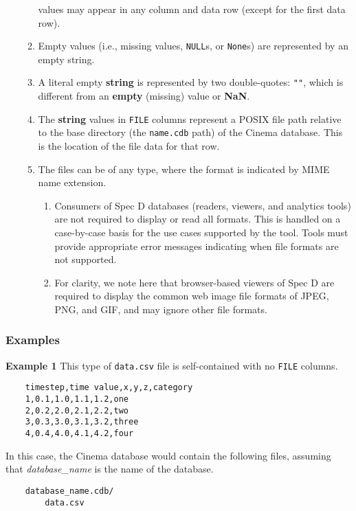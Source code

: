 \begin{enumerate}
\begin{enumerate}
values may appear in any column and data row (except for the first data row). 
\item Empty values (i.e., missing values, \texttt{\small NULL}s, or 
\texttt{\small None}s) are represented by an empty string.  
\item A literal empty \textbf{string} is represented by two double-quotes: 
\texttt{""}, which is different from an \textbf{empty} (missing) value or 
\textbf{NaN}. 
\item The \textbf{string} values in \texttt{\small FILE} columns represent
a POSIX file path relative to the base directory (the \texttt{\small name.cdb} 
path) of the Cinema database. This is the location of the file data for that 
row.
\item The files can be of any type, where the format is indicated by MIME name 
extension.
\begin{enumerate}
\item Consumers of Spec D databases (readers, viewers, and analytics tools) 
are not required to display or read all formats. This is handled on a 
case-by-case basis for the use cases supported by the tool. Tools must 
provide appropriate error messages indicating when file formats are not 
supported. 
\item For clarity, we note here that browser-based viewers of Spec D are 
required to display the common web image file formats of JPEG, PNG, and GIF, 
and may ignore other file formats.
\end{enumerate}
\end{enumerate}
\end{enumerate}

\subsubsection{Examples}

\noindent
\textbf{Example 1} This type of \texttt{\small data.csv} file is 
self-contained with no \texttt{\small FILE} columns.

\begin{verbatim}
    timestep,time value,x,y,z,category
    1,0.1,1.0,1.1,1.2,one
    2,0.2,2.0,2.1,2.2,two
    3,0.3,3.0,3.1,3.2,three
    4,0.4,4.0,4.1,4.2,four
\end{verbatim}

\noindent
In this case, the Cinema database would contain the following files,
assuming that {\em database\_name} is the name of the database.

\begin{verbatim}
    database_name.cdb/
        data.csv
\end{verbatim}

